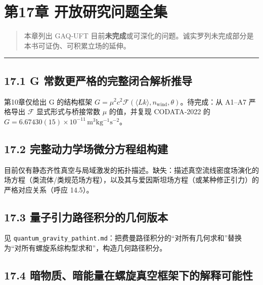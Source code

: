 \section{第17章
开放研究问题全集}\label{ux7b2c17ux7ae0-ux5f00ux653eux7814ux7a76ux95eeux9898ux5168ux96c6-1}

\begin{quote}
本章列出 GAQ‑UFT
目前\textbf{未完成}或可深化的问题。诚实罗列未完成部分是本书可证伪、可积累立场的延伸。
\end{quote}

\begin{center}\rule{0.5\linewidth}{0.5pt}\end{center}

\subsection{17.1 G
常数更严格的完整闭合解析推导}\label{g-ux5e38ux6570ux66f4ux4e25ux683cux7684ux5b8cux6574ux95edux5408ux89e3ux6790ux63a8ux5bfc}

第10章仅给出 G 的结构框架
\(G=\mu^2 c^2\mathcal{F}(\langle Lk\rangle,n_{\mathrm{wind}},\theta)\)。待完成：从
A1--A7 严格导出 \(\mathcal{F}\) 显式形式与桥接常数 \(\mu\) 的值，并复现
CODATA‑2022 的
\(G=6.67430(15)\times10^{-11}\,\mathrm{m^3kg^{-1}s^{-2}}\)。

\subsection{17.2
完整动力学场微分方程组构建}\label{ux5b8cux6574ux52a8ux529bux5b66ux573aux5faeux5206ux65b9ux7a0bux7ec4ux6784ux5efa}

目前仅有静态齐性真空与局域激发的拓扑描述。缺失：描述真空流线密度场演化的场方程（类流体/类规范场方程），以及其与爱因斯坦场方程（或某种修正引力）的严格对应关系（呼应
14.5）。

\subsection{17.3
量子引力路径积分的几何版本}\label{ux91cfux5b50ux5f15ux529bux8defux5f84ux79efux5206ux7684ux51e0ux4f55ux7248ux672c}

见
\texttt{quantum\_gravity\_pathint.md}：把费曼路径积分的``对所有几何求和''替换为``对所有螺旋系综构型求和''，构造几何路径积分。

\subsection{17.4
暗物质、暗能量在螺旋真空框架下的解释可能性}\label{ux6697ux7269ux8d28ux6697ux80fdux91cfux5728ux87baux65cbux771fux7a7aux6846ux67b6ux4e0bux7684ux89e3ux91caux53efux80fdux6027}

